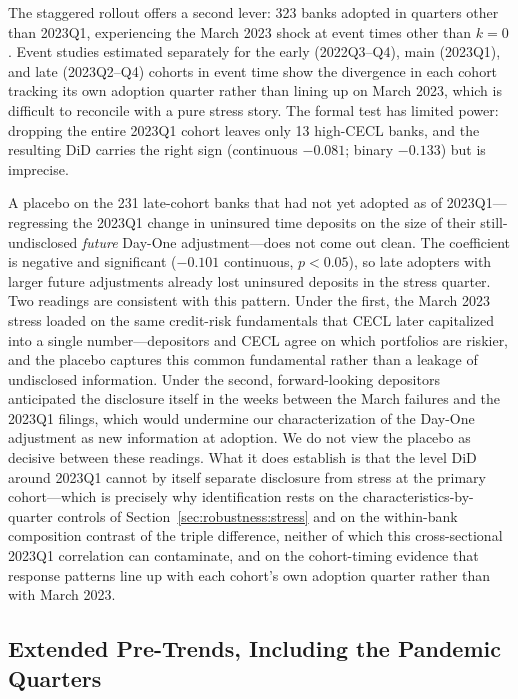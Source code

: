 The staggered rollout offers a second lever: 323 banks adopted in quarters
other than 2023Q1, experiencing the March 2023 shock at event times other
than $k=0$.  Event studies estimated separately for the early (2022Q3--Q4),
main (2023Q1), and late (2023Q2--Q4) cohorts in event time show the
divergence in each cohort tracking its own adoption quarter rather than
lining up on March 2023, which is difficult to reconcile with a pure
stress story.  The formal test has limited power: dropping the entire
2023Q1 cohort leaves only 13 high-CECL banks, and the resulting DiD
carries the right sign (continuous $-0.081$; binary $-0.133$) but is
imprecise.

A placebo on the 231 late-cohort banks that had not yet adopted as of
2023Q1---regressing the 2023Q1 change in uninsured time deposits on the
size of their still-undisclosed \emph{future} Day-One adjustment---does
not come out clean.  The coefficient is negative and significant
($-0.101$ continuous, $p<0.05$), so late adopters with larger future
adjustments already lost uninsured deposits in the stress quarter.
Two readings are consistent with this pattern.  Under the first, the
March 2023 stress loaded on the same credit-risk fundamentals that CECL
later capitalized into a single number---depositors and CECL agree on
which portfolios are riskier, and the placebo captures this common
fundamental rather than a leakage of undisclosed information.  Under the
second, forward-looking depositors anticipated the disclosure itself in
the weeks between the March failures and the 2023Q1 filings, which would
undermine our characterization of the Day-One adjustment as new
information at adoption.  We do not view the placebo as decisive
between these readings.  What it does establish is that the level
DiD around 2023Q1 cannot by itself separate disclosure from stress at
the primary cohort---which is precisely why identification rests on the
characteristics-by-quarter controls of Section~\ref{sec:robustness:stress}
and on the within-bank composition contrast of the triple difference,
neither of which this cross-sectional 2023Q1 correlation can
contaminate, and on the cohort-timing evidence that response patterns
line up with each cohort's own adoption quarter rather than with March
2023.

\subsection{Extended Pre-Trends, Including the Pandemic Quarters}
\label{sec:robustness:pretrends}

